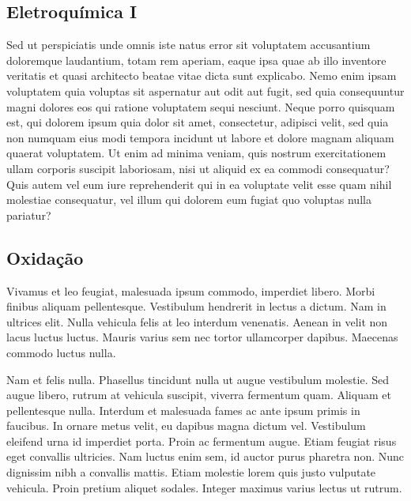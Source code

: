 \documentclass[12pt]{article}
\begin{document}
    \begin{multicols*}{2}
        
        \section*{Eletroquímica I}
        Sed ut perspiciatis unde omnis iste natus error sit voluptatem accusantium doloremque laudantium, 
        totam rem aperiam, eaque ipsa quae ab illo inventore veritatis et quasi architecto beatae vitae dicta 
        sunt explicabo. Nemo enim ipsam voluptatem quia voluptas sit aspernatur aut odit aut fugit, sed quia 
        consequuntur magni dolores eos qui ratione voluptatem sequi nesciunt. Neque porro quisquam est, qui 
        dolorem ipsum quia dolor sit amet, consectetur, adipisci velit, sed quia non numquam eius modi 
        tempora incidunt ut labore et dolore magnam aliquam quaerat voluptatem. Ut enim ad minima veniam, 
        quis nostrum exercitationem ullam corporis suscipit laboriosam, nisi ut aliquid ex ea commodi 
        consequatur? Quis autem vel eum iure reprehenderit qui in ea voluptate velit esse quam nihil molestiae 
        consequatur, vel illum qui dolorem eum fugiat quo voluptas nulla pariatur?
        
        \subsection*{Oxidação}
        Vivamus et leo feugiat, malesuada ipsum commodo, imperdiet libero. Morbi finibus aliquam pellentesque. 
        Vestibulum hendrerit in lectus a dictum. Nam in ultrices elit. Nulla vehicula felis at leo interdum 
        venenatis. Aenean in velit non lacus luctus luctus. Mauris varius sem nec tortor ullamcorper dapibus. 
        Maecenas commodo luctus nulla.
        
        Nam et felis nulla. Phasellus tincidunt nulla ut augue vestibulum molestie. Sed augue libero, rutrum 
        at vehicula suscipit, viverra fermentum quam. Aliquam et pellentesque nulla. Interdum et malesuada 
        fames ac ante ipsum primis in faucibus. In ornare metus velit, eu dapibus magna dictum vel. 
        Vestibulum eleifend urna id imperdiet porta. Proin ac fermentum augue. Etiam feugiat risus eget 
        convallis ultricies. Nam luctus enim sem, id auctor purus pharetra non. Nunc dignissim nibh a 
        convallis mattis. Etiam molestie lorem quis justo vulputate vehicula. Proin pretium aliquet sodales. 
        Integer maximus varius lectus ut rutrum.
        

\end{multicols*}
\end{document}
